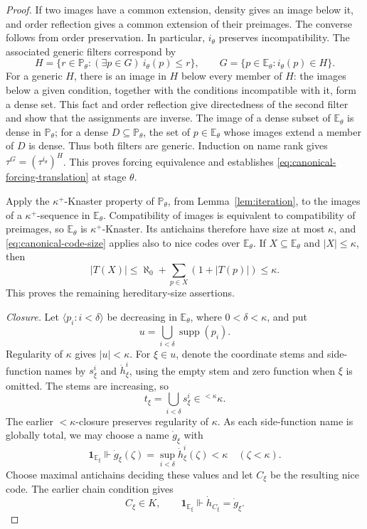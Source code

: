 \documentclass[10pt,a4paper]{amsart}
\theoremstyle{definition}
\theoremstyle{remark}
\newcommand{\PP}{\mathbb P}
\newcommand{\EE}{\mathbb E}
\DeclareMathOperator{\supp}{supp}
\begin{document}
\begin{proof}
If two images have a common extension, density gives an
image below it, and order reflection gives a common
extension of their preimages. The converse follows from
order preservation. In particular, \(i_\theta\)
preserves incompatibility. The associated generic filters
correspond by
\[
 H=\{r\in\PP_\theta:(\exists p\in G)\ i_\theta(p)\leq r\},
 \qquad G=\{p\in\EE_\theta:i_\theta(p)\in H\}.
\]
For a generic \(H\), there is an image in \(H\) below
every member of \(H\): the images below a given condition,
together with the conditions incompatible with it, form a
dense set. This fact and order reflection give directedness
of the second filter and show that the assignments are
inverse. The image of a dense subset of \(\EE_\theta\)
is dense in \(\PP_\theta\); for a dense
\(D\subseteq\PP_\theta\), the set of \(p\in\EE_\theta\)
whose images extend a member of \(D\) is dense. Thus both
filters are generic. Induction on name rank gives
\(\tau^G=(\tau^{i_\theta})^H\). This proves forcing
equivalence and establishes
\eqref{eq:canonical-forcing-translation} at stage
\(\theta\).

Apply the \(\kappa^+\)-Knaster property of
\(\PP_\theta\), from Lemma~\ref{lem:iteration}, to
the images of a \(\kappa^+\)-sequence in \(\EE_\theta\).
Compatibility of images is equivalent to compatibility
of preimages, so \(\EE_\theta\) is
\(\kappa^+\)-Knaster. Its antichains therefore have
size at most \(\kappa\), and
\eqref{eq:canonical-code-size} applies also to nice
codes over \(\EE_\theta\). If
\(X\subseteq\EE_\theta\) and \(|X|\leq\kappa\), then
\[
 |T(X)|\leq\aleph_0+\sum_{p\in X}(1+|T(p)|)
                           \leq\kappa.
\]
This proves the remaining hereditary-size assertions.

\emph{Closure.}
Let \(\langle p_i:i<\delta\rangle\) be decreasing in
\(\EE_\theta\), where \(0<\delta<\kappa\), and put
\[
 u=\bigcup_{i<\delta}\supp(p_i).
\]
Regularity of \(\kappa\) gives \(|u|<\kappa\).
For \(\xi\in u\), denote the coordinate stems and
side-function names by \(s_\xi^i\) and
\(\dot h_\xi^i\), using the empty stem and zero
function when \(\xi\) is omitted. The stems are
increasing, so
\[
 t_\xi=\bigcup_{i<\delta}s_\xi^i\in{}^{<\kappa}\kappa.
\]
The earlier \(<\kappa\)-closure preserves regularity
of \(\kappa\). As each side-function name is globally
total, we may choose a name \(\dot g_\xi\) with
\[
 \mathbf1_{\EE_\xi}\Vdash
 \dot g_\xi(\zeta)=\sup_{i<\delta}\dot h_\xi^i(\zeta)<\kappa
                                      \quad(\zeta<\kappa).
\]
Choose maximal antichains deciding these values and let
\(C_\xi\) be the resulting nice code. The earlier
chain condition gives
\[
 C_\xi\in K,\qquad
 \mathbf1_{\EE_\xi}\Vdash\dot h_{C_\xi}=\dot g_\xi.
\]


\end{proof}
\end{document}
